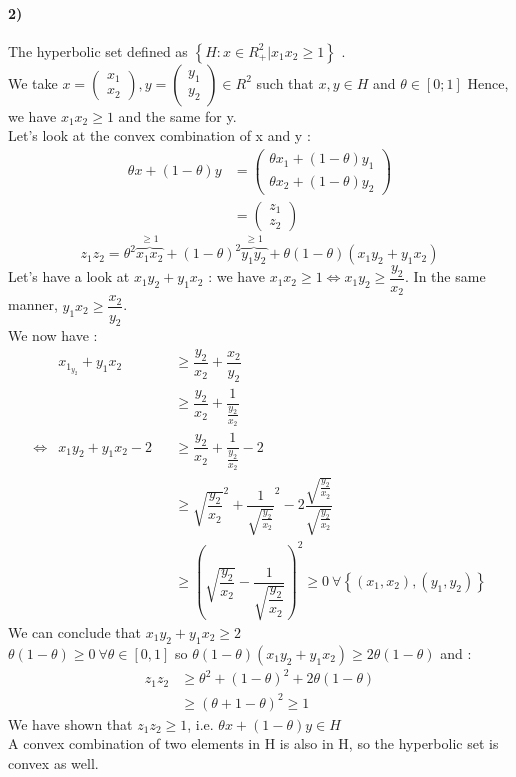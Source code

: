 \documentclass[12pt,a4paper]{article}
\begin{document}
\paragraph{2)} The hyperbolic set defined as $\left\lbrace H :  x \in R^2_+ | x_1x_2 \geq 1\right\rbrace$ .\\
We take $ x = \begin{pmatrix}
	x_1 \\ x_2  
\end{pmatrix},y = \begin{pmatrix}
	y_1\\y_2 
\end{pmatrix}\in R^2 $ such that $ x,y \in H $ and $ \theta \in [0;1] $
Hence, we have $ x_1 x_2 \geq 1 $ and the same for y.\\
Let's look at the convex combination of x and y : 
\begin{align*}
	\theta x + (1-\theta) y & = \begin{pmatrix}
		\theta x_1 + (1-\theta) y_1 \\
		\theta x_2 + (1-\theta) y_2
	\end{pmatrix} \\
				& = \begin{pmatrix}
					z_1 \\ z_2 
				\end{pmatrix}
\end{align*}
\[
	z_1 z_2 = \theta^2 \overbrace{x_1x_2}^{\geq 1}+ (1-\theta)^2 \overbrace{y_1y_2}^{\geq 1} + \theta (1-\theta) (x_1y_2+y_1x_2)
\]\newline
Let's have a look at $ x_1y_2 + y_1x_2 $ : we have $ x_1 x_2 \geq 1 \Leftrightarrow x_1 y_2 \geq \dfrac{y_2}{x_2} $. In the same manner, $ y_1 x_2 \geq \dfrac{x_2}{y_2} $.\\
We now have : \begin{align*}
	& x_1_y_2 + y_1x_2 && \geq \dfrac{y_2}{x_2} + \dfrac{x_2}{y_2} \\
	& && \geq \dfrac{y_2}{x_2} + \dfrac{1}{\frac{y_2}{x_2}}\\
	\Leftrightarrow & x_1y_2 + y_1x_2 -2 &&\geq  \dfrac{y_2}{x_2} + \dfrac{1}{\frac{y_2}{x_2}}-2\\
			& && \geq \sqrt{\dfrac{y_2}{x_2}}^2+\dfrac{1}{\sqrt{\frac{y_2}{x_2}}}^2
		-2 \dfrac{\sqrt{\frac{y_2}{x_2}}}{\sqrt{\frac{y_2}{x_2}}}\\
			& && \geq \left( \sqrt{\dfrac{y_2}{x_2}}-\dfrac{1}{\sqrt{\dfrac{y_2}{x_2}}}\right)^2\geq 0 ~\forall \left\lbrace (x_1,x_2), (y_1,y_2)\right\rbrace
\end{align*}
We can conclude that $ x_1y_2 + y_1x_2 \geq 2 $\\
$ \theta (1-\theta)\geq 0 ~\forall \theta \in [0,1] $ so $ \theta (1-\theta) (x_1y_2+y_1x_2) \geq 2\theta (1-\theta) $ and : \begin{align*}
	z_1z_2 &\geq \theta ^2 + (1-\theta)^2 + 2\theta(1-\theta) \\
	       &\geq (\theta + 1 - \theta)^2 \geq 1
\end{align*}
We have shown that $ z_1z_2 \geq 1 $, i.e. $ \theta x + (1-\theta)y \in H $\\
A convex combination of two elements in H is also in H, so the hyperbolic set is convex as well.
\end{document}
